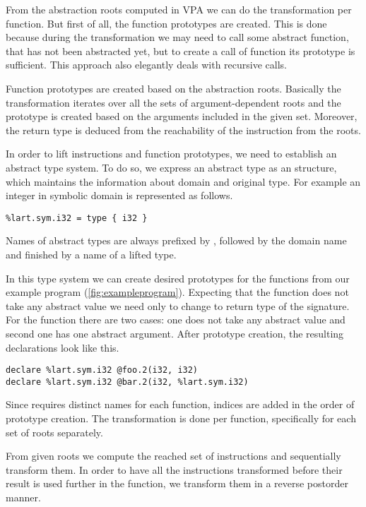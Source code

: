From the abstraction roots computed in VPA we can do the transformation per
function. But first of all, the function prototypes are created. This is done
because during the transformation we may need to call some abstract function,
that has not been abstracted yet, but to create a call of function its prototype
is sufficient. This approach also elegantly deals with recursive calls.


Function prototypes are created based on the abstraction roots. Basically
the transformation iterates over all the sets of argument-dependent roots and
the prototype is created based on the arguments included in the given set.
Moreover, the return type is deduced from the reachability of the  instruction
from the roots.

In order to lift \LLVM instructions and function prototypes, we need to
establish an abstract type system. To do so, we express an abstract type as an
\LLVM structure, which maintains the information about domain and original
type. For example an integer in symbolic domain is represented as follows.

\begin{verbatim}
%lart.sym.i32 = type { i32 }
\end{verbatim}

Names of abstract types are always prefixed by , followed by the
domain name and finished by a name of a lifted \LLVM type.

In this type system we can create desired prototypes for the functions from our
example program (\autoref{fig:exampleprogram}). Expecting that the function 
does not take any abstract value we need only to change to return type of the
signature. For the function  there are two cases: one does not take any
abstract value and second one has one abstract argument. After prototype
creation, the resulting \LLVM declarations look like this.
\begin{verbatim}
declare %lart.sym.i32 @foo.2(i32, i32)
declare %lart.sym.i32 @bar.2(i32, %lart.sym.i32)
\end{verbatim}
Since \LLVM requires distinct names for each function, indices are added in
the order of prototype creation. The transformation is done per function,
specifically for each set of roots separately.

From given roots we compute the reached set of instructions and sequentially
transform them. In order to have all the instructions transformed before their
result is used further in the function, we transform them in a reverse postorder manner.

